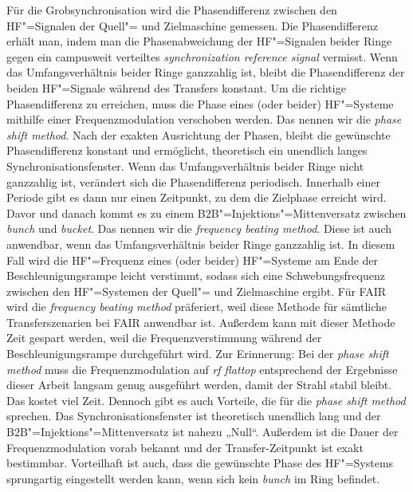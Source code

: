 F\"ur die Grobsynchronisation wird die Phasendifferenz zwischen den HF"=Signalen der Quell"= und Zielmaschine gemessen. Die Phasendifferenz erhält man, indem man die Phasenabweichung der HF"=Signalen beider Ringe gegen ein campusweit verteiltes \textit{synchronization reference signal} vermisst. Wenn das Umfangsverh\"altnis  beider Ringe ganzzahlig ist, bleibt die Phasendifferenz der beiden HF"=Signale w\"ahrend des Transfers konstant. Um die richtige Phasendifferenz zu erreichen, muss die Phase eines (oder beider) HF"=Systeme mithilfe einer Frequenzmodulation verschoben werden. Das nennen wir die \textit{phase shift method}. Nach der exakten Ausrichtung der Phasen, bleibt die gew\"unschte Phasendifferenz konstant und erm\"oglicht, theoretisch ein unendlich langes Synchronisationsfenster. Wenn das Umfangsverh\"altnis beider Ringe nicht ganzzahlig ist, ver\"andert sich die Phasendifferenz periodisch. Innerhalb einer Periode gibt es dann nur einen Zeitpunkt, zu dem die Zielphase erreicht wird. Davor und danach kommt es zu einem B2B"=Injektions"=Mittenversatz zwischen \textit{bunch} und \textit{bucket}. Das nennen wir die \textit{frequency beating method}. Diese ist auch anwendbar, wenn das Umfangsverh\"altnis beider Ringe ganzzahlig ist. In diesem Fall wird die HF"=Frequenz eines (oder beider) HF"=Systeme am Ende der Beschleunigungsrampe leicht verstimmt, sodass sich eine Schwebungsfrequenz zwischen den HF"=Systemen der Quell"= und Zielmaschine ergibt. F\"ur FAIR wird die \textit{frequency beating method} pr\"aferiert, weil diese Methode f\"ur s\"amtliche Transferszenarien bei FAIR anwendbar ist. Au\ss{}erdem kann mit dieser Methode Zeit gespart werden, weil die Frequenzverstimmung w\"ahrend der Beschleunigungsrampe durchgef\"uhrt wird. Zur Erinnerung: Bei der \textit{phase shift method} muss die Frequenzmodulation auf \textit{rf flattop} entsprechend der Ergebnisse dieser Arbeit langsam genug ausgef\"uhrt werden, damit der Strahl stabil bleibt. Das kostet viel Zeit.  Dennoch gibt es auch Vorteile, die f\"ur die \textit{phase shift method} sprechen. Das Synchronisationsfenster ist theoretisch unendlich lang und der B2B"=Injektions"=Mittenversatz ist nahezu „Null“. Au\ss{}erdem ist die Dauer der Frequenzmodulation vorab bekannt und der Transfer-Zeitpunkt ist exakt bestimmbar. Vorteilhaft ist auch, dass die gew\"unschte Phase des HF"=Systems  sprungartig eingestellt werden kann, wenn sich kein \textit{bunch} im Ring befindet.

